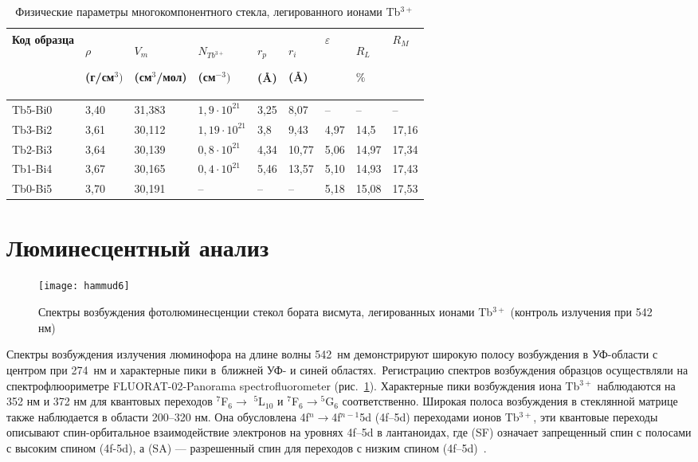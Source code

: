 \documentclass[press]{vestnik}
\begin{document}
\begin{table}[h!]
\caption{Физические параметры многокомпонентного стекла, легированного ионами Tb$^{3+}$}
\begin{tabularx}{\textwidth}{|Y|Y|Y|Y|Y|Y|P{8mm}|P{8mm}|P{8mm}|}
\hline
Код образца& 
$\rho $ \par (г/см$^{3})$& 
$V_{m}$ \par (см$^{3}$/мол)& 
$N_{{Tb}^{3+}}$ \par (см$^{-3})$& 
$r_{p}$ \par (\AA)& 
$r_{i}$ \par (\AA)& 
$\varepsilon $& 
$R_{L}$ \par $\% $& 
$R_{M}$ \\
\hline
Tb5-Bi0& 
3,40& 
31,383& 
$1,9\cdot 10^{21}$& 
3,25& 
8,07& 
--& 
--& 
-- \\
\hline
Tb3-Bi2& 
3,61& 
30,112& 
$1,19\cdot 10^{21}$& 
3,8& 
9,43& 
4,97& 
14,5& 
17,16 \\
\hline
Tb2-Bi3& 
3,64& 
30,139& 
$0,8\cdot 10^{21}$& 
4,34& 
10,77& 
5,06& 
14,97& 
17,34 \\
\hline
Tb1-Bi4& 
3,67& 
30,165& 
$0,4\cdot 10^{21}$& 
5,46& 
13,57& 
5,10& 
14,93& 
17,43 \\
\hline
Tb0-Bi5& 
3,70& 
30,191& 
--& 
--& 
--& 
5,18& 
15,08& 
17,53 \\
\hline
\end{tabularx}
\label{tab1}
\end{table}

\section{Люминесцентный анализ}


\begin{figure}[b!]
\centerline{\texttt{[image: hammud6]}}
\caption{Спектры возбуждения фотолюминесценции стекол бората висмута, 
легированных ионами Tb$^{3+}$ (контроль излучения при 542 нм)}
\label{fig6}
\end{figure}

Спектры возбуждения излучения люминофора на длине волны 542~нм демонстрируют 
широкую полосу возбуждения в УФ-области с центром при 274~нм и характерные 
пики в~ближней УФ- и синей областях.~Регистрацию спектров возбуждения 
образцов осуществляли на спектрофлюориметре FLUORAT-02-Panorama 
spectrofluorometer (рис.~\ref{fig6}). Характерные пики возбуждения иона Tb$^{3+}$ 
наблюдаются на 352 нм и 372 нм для квантовых переходов $^{7}$F$_{6}  \to $ 
$^{5}$L$_{10}$ и $^{7}$F$_{6} \to {}^{5}$G$_{6}$ соответственно. Широкая 
полоса возбуждения в стеклянной матрице также наблюдается в области 200--320 
нм. Она обусловлена 4f$^{n}\to $4f$^{n-1}$5d (4f--5d) переходами ионов 
Tb$^{3+}$, эти квантовые переходы описывают спин-орбитальное взаимодействие 
электронов на уровнях 4f--5d в лантаноидах, где (SF) означает запрещенный 
спин с полосами с высоким спином (4f-5d), а (SA) --- разрешенный спин для 
переходов с низким спином (4f--5d)~\cite{B21}.
\end{document}
